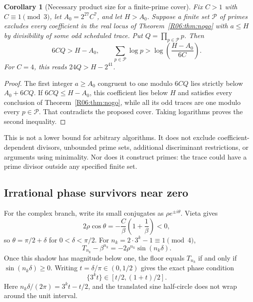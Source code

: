 \documentclass[11pt,a4paper]{article}
\newtheorem{corollary}[theorem]{Corollary}\newtheorem{mainthm}[theorem]{Theorem}
\theoremstyle{definition}\newtheorem{definition}[theorem]{Definition}
\theoremstyle{remark}\newtheorem{remark}[theorem]{Remark}
\begin{document}
\begin{corollary}[Necessary product size for a finite-prime cover]
\label{R06:cor:product}
Fix $C>1$ with $C\equiv1\pmod3$, let $A_0=2^{27}C^7$, and let
$H>A_0$. Suppose a finite set $\mathcal P$ of primes excludes every
coefficient in the real locus of Theorem~\ref{R06:thm:nogo} with $a\le H$
by divisibility of some odd scheduled trace. Put
$Q=\prod_{p\in\mathcal P}p$. Then
\[
 6CQ>H-A_0,\qquad
 \sum_{p\in\mathcal P}\log p>
       \log\!\left(\frac{H-A_0}{6C}\right).
\]
For $C=4$, this reads $24Q>H-2^{41}$.
\end{corollary}
\begin{proof}
The first integer $a\ge A_0$ congruent to one modulo $6CQ$ lies
strictly below $A_0+6CQ$. If $6CQ\le H-A_0$, this coefficient lies
below $H$ and satisfies every conclusion of Theorem~\ref{R06:thm:nogo},
while all its odd traces are one modulo every $p\in\mathcal P$.
That contradicts the proposed cover. Taking logarithms proves the
second inequality.
\end{proof}

This is not a lower bound for arbitrary algorithms. It does not
exclude coefficient-dependent divisors, unbounded prime sets,
additional discriminant restrictions, or arguments using minimality.
Nor does it construct primes: the trace could have a prime divisor
outside any specified finite set.

\subsection{Irrational phase survivors near zero}
\label{R06:sec:phase}

For the complex branch, write its small conjugates as
$\rho e^{\pm i\theta}$. Vieta gives
\[
 2\rho\cos\theta=-\frac C\beta\left(1+\frac1\beta\right)<0,
\]
so $\theta=\pi/2+\delta$ for $0<\delta<\pi/2$.
For $n_k=2\cdot3^k-1\equiv1\pmod4$,
\[
 T_{n_k}-\beta^{n_k}=-2\rho^{n_k}\sin(n_k\delta).
\]
Once this shadow has magnitude below one, the floor equals $T_{n_k}$
if and only if $\sin(n_k\delta)\ge0$.
Writing $t=\delta/\pi\in(0,1/2)$ gives the exact phase condition
\begin{equation}\label{R06:eq:survivor}
 \{3^kt\}\in[t/2,(1+t)/2].
\end{equation}
Here $n_k\delta/(2\pi)=3^kt-t/2$, and the translated sine
half-circle does not wrap around the unit interval.
\end{document}
